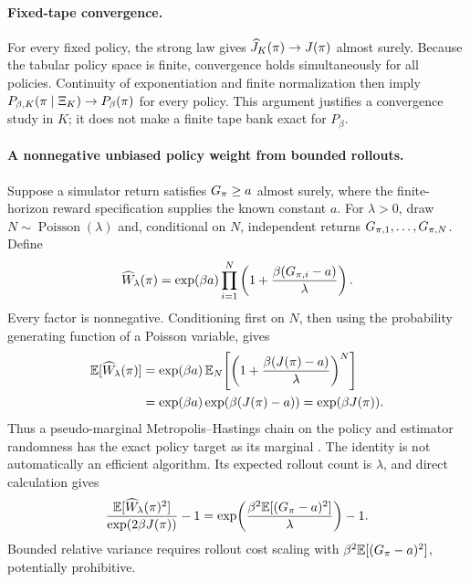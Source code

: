 \paragraph{Fixed-tape convergence.}
For every fixed policy, the strong law gives
\(\widehat J_K(\pi)\to J(\pi)\) almost surely.  Because the tabular
policy space is finite, convergence holds simultaneously for all policies.
Continuity of exponentiation and finite normalization then imply
\(P_{\beta,K}(\pi\mid\Xi_K)\to P_\beta(\pi)\) for every policy.
This argument justifies a convergence study in \(K\); it does not make a
finite tape bank exact for \(P_\beta\).

\paragraph{A nonnegative unbiased policy weight from bounded rollouts.}
Suppose a simulator return satisfies \(G_\pi\geq a\) almost surely, where
the finite-horizon reward specification supplies the known constant \(a\).
For \(\lambda>0\), draw \(N\sim\operatorname{Poisson}(\lambda)\) and, conditional
on \(N\), independent returns \(G_{\pi,1},\ldots,G_{\pi,N}\).  Define
\begin{equation}
  \widehat W_{\lambda}(\pi)
  = \exp(\beta a)
    \prod_{i=1}^{N}
      \left(1+\frac{\beta(G_{\pi,i}-a)}{\lambda}\right).
  \label{eq:poisson-policy-weight}
\end{equation}
Every factor is nonnegative.  Conditioning first on \(N\), then using the
probability generating function of a Poisson variable, gives
\begin{align}
  \mathbb{E}[\widehat W_{\lambda}(\pi)]
  &= \exp(\beta a)\,
     \mathbb{E}_N\!\left[
       \left(1+\frac{\beta(J(\pi)-a)}{\lambda}\right)^N
     \right] \\
  &= \exp(\beta a)\exp(\beta(J(\pi)-a))
   = \exp(\beta J(\pi)).
\end{align}
Thus a pseudo-marginal Metropolis--Hastings chain on the policy and estimator
randomness has the exact policy target as its marginal
\citep{andrieuRoberts2009,jacobThiery2015}.  The identity is not automatically
an efficient algorithm.  Its expected rollout count is \(\lambda\), and direct
calculation gives
\begin{equation}
  \frac{\mathbb{E}[\widehat W_{\lambda}(\pi)^2]}
       {\exp(2\beta J(\pi))}-1
  = \exp\!\left(
      \frac{\beta^2\mathbb{E}[(G_\pi-a)^2]}{\lambda}
    \right)-1.
  \label{eq:poisson-policy-weight-rv}
\end{equation}
Bounded relative variance requires rollout cost scaling with
\(\beta^2\mathbb{E}[(G_\pi-a)^2]\), potentially prohibitive.

